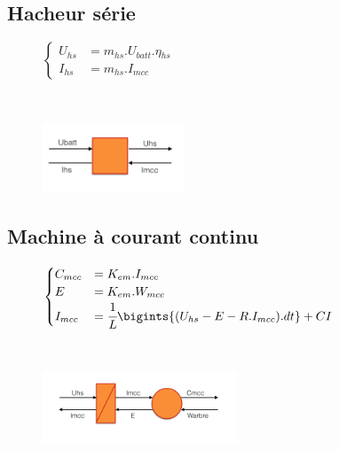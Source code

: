 \subsection{Hacheur série}
\vspace{-10px}
\begin{figure}[ht]
\centering
\begin{minipage}{.5\textwidth}  
\centering
$\begin{cases}
	 U_{hs} &= m_{hs}.U_{batt}.\eta{}_{hs}\\
	I_{hs} &= m_{hs}.I_{mcc}
\end{cases}$
\end{minipage}~
\begin{minipage}{.5\textwidth}
  \centering
\includegraphics[height=80px]{images/Choppers.png}
\end{minipage}
\end{figure}
\FloatBarrier
\vspace{-20px}

\subsection{Machine à courant continu}
\vspace{-10px}
\begin{figure}[ht]
\centering
\begin{minipage}{.5\textwidth}  
\centering
$\begin{cases}
	C_{mcc} &= K_{em}.I_{mcc}\\
	E &= K_{em}.W_{mcc}\\
	I_{mcc} &= \cfrac{1}{L}\bigints{(U_{hs}-E-R.I_{mcc}).dt}+CI
\end{cases}$
\end{minipage}~
\begin{minipage}{.5\textwidth}
  \centering
\includegraphics[height=80px]{images/MCC.png}
\end{minipage}
\end{figure}
\FloatBarrier
\vspace{-20px}

